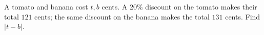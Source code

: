 A tomato and banana cost $t,b$ cents. A $20\%$ discount on the tomato makes their total $121$ cents; the same discount on the banana makes the total $131$ cents. Find $|t-b|$.
